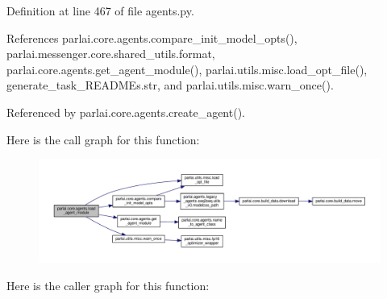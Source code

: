 Definition at line 467 of file agents.\+py.



References parlai.\+core.\+agents.\+compare\+\_\+init\+\_\+model\+\_\+opts(), parlai.\+messenger.\+core.\+shared\+\_\+utils.\+format, parlai.\+core.\+agents.\+get\+\_\+agent\+\_\+module(), parlai.\+utils.\+misc.\+load\+\_\+opt\+\_\+file(), generate\+\_\+task\+\_\+\+R\+E\+A\+D\+M\+Es.\+str, and parlai.\+utils.\+misc.\+warn\+\_\+once().



Referenced by parlai.\+core.\+agents.\+create\+\_\+agent().

Here is the call graph for this function\+:
\nopagebreak
\begin{figure}[H]
\begin{center}
\leavevmode
\includegraphics[width=350pt]{namespaceparlai_1_1core_1_1agents_a213df46dd21144eb4c056bb58c294c5d_cgraph}
\end{center}
\end{figure}
Here is the caller graph for this function\+:
\nopagebreak
